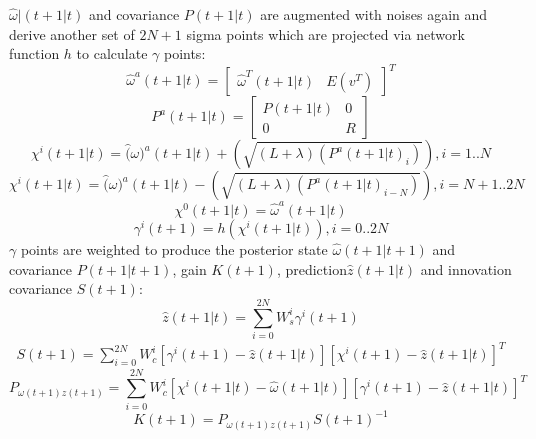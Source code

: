 \documentclass[letterpaper]{article}
\begin{document}
\begin{enumerate}
    $\hat{\omega}|(t+1|t)$ and covariance $P(t+1|t)$ are augmented with noises again and derive another set of $2N+1$ sigma points which are projected via network function $h$ to calculate $\gamma$ points:
    \begin{equation}
      \hat{\omega}^a(t+1|t)=
      \begin{bmatrix} \hat{\omega}^T(t+1|t) & E(v^T)\end{bmatrix}^T
    \end{equation}
    \begin{equation}
      P^a(t+1|t)=
      \begin{bmatrix}
        P(t+1|t) & 0 \\
        0 & R
      \end{bmatrix}
    \end{equation}      
    \begin{equation}
      \chi^i(t+1|t)=\hat(\omega)^a(t+1|t)+(\sqrt{(L+\lambda)(P^a(t+1|t)_i)}),i=1..N
    \end{equation}
    \begin{equation}
      \chi^i(t+1|t)=\hat(\omega)^a(t+1|t)-(\sqrt{(L+\lambda)(P^a(t+1|t)_{i-N})}),i=N+1..2N
    \end{equation}
    \begin{equation}
      \chi^0(t+1|t)=\hat{\omega}^a(t+1|t)
    \end{equation}
    \begin{equation}
      \gamma^i(t+1)=h(\chi^i(t+1|t)), i = 0..2N
    \end{equation}
    $\gamma$ points are weighted to produce the posterior state $\hat{\omega}(t+1|t+1)$ and covariance $P(t+1|t+1)$, gain $K(t+1)$, prediction$\hat{z}(t+1|t)$ and innovation covariance $S(t+1)$:
    \begin{equation}
      \hat{z}(t+1|t)=\displaystyle\sum\limits_{i=0}^{2N} W_s^i \gamma^i(t+1)
    \end{equation}
    \begin{align}
      S(t+1)=\displaystyle\sum\limits_{i=0}^{2N} W_c^i [\gamma^i(t+1)-\hat{z}(t+1|t)][\chi^i(t+1)-\hat{z}(t+1|t)]^T
    \end{align}
    \begin{equation}
      P_{\omega(t+1)z(t+1)}=\displaystyle\sum\limits_{i=0}^{2N} W_c^i[\chi^i(t+1|t)-\hat{\omega}(t+1|t)][\gamma^i(t+1)-\hat{z}(t+1|t)]^T
    \end{equation}
    \begin{equation}
      K(t+1)=P_{\omega(t+1)z(t+1)}S(t+1)^{-1}
    \end{equation}

\end{enumerate}
\end{document}

